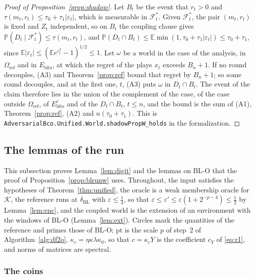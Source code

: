 \documentclass[11pt]{amsart}
\theoremstyle{definition}
\numberwithin{equation}{section}
\newcommand{\E}{\mathbb{E}}
\newcommand{\Prob}{\mathbb{P}}
\newcommand{\cK}{\mathcal{K}}
\newcommand{\cF}{\mathscr{F}}
\begin{document}
\begin{proof}[Proof of Proposition~\ref{prop:shadow}]
Let $B_t$ be the event that $r_t>0$ and $\tau(m_t,r_t)\le\tau_0+\tau_1|\varepsilon_t|$, which is measurable in $\cF^*_t$. Given $\cF^*_t$, the pair $(m_t,r_t)$ is fixed and $Z_t$ independent, so on $B_t$ the coupling clause gives $\Prob(D_t\mid\cF^*_t)\le\tau(m_t,r_t)$, and $\Prob(D_t\cap B_t)\le\E\min(1,\tau_0+\tau_1|\varepsilon_t|)\le\tau_0+\tau_1$, since $\E|\varepsilon_t|\le(\E e^{\varepsilon_t^2}-1)^{1/2}\le1$. Let $\omega$ be a world in the case of the analysis, in $\Omega_{\mathrm{ref}}$ and in $E_{\mathrm{bits}}$, at which the regret of the plays $x_t$ exceeds $B_n+1$. If no round decouples, (A3) and Theorem~\ref{prop:ref} bound that regret by $B_n+1$; so some round decouples, and at the first one, $t$, (A3) puts $\omega$ in $D_t\cap B_t$. The event of the claim therefore lies in the union of the complement of the case, of the case outside $\Omega_{\mathrm{ref}}$, of $E_{\mathrm{bits}}^c$ and of the $D_t\cap B_t$, $t\le n$, and the bound is the sum of (A1), Theorem~\ref{prop:ref}, (A2) and $n(\tau_0+\tau_1)$.
This is \texttt{AdversarialBco.Unified.World.shadowPropW\_holds} in the formalization.
\end{proof}

\subsection{The lemmas of the run}\label{app:track}

This subsection proves Lemma~\ref{lem:digit} and the lemmas on BL-O that the proof of Proposition~\ref{prop:blrunw} uses. Throughout, the input satisfies the hypotheses of Theorem~\ref{thm:unified}, the oracle is a weak membership oracle for $\cK$, the reference runs at $\delta_{\mathrm{BL}}$ with $\varepsilon\le\frac14$, so that $\varepsilon\le\varepsilon'\le\varepsilon(1+2^{-p-4})\le\frac12$ by Lemma~\ref{lem:enc}, and the coupled world is the extension of an environment with the windows of BL-O (Lemma~\ref{lem:ext}). Circles mark the quantities of the reference and primes those of BL-O; $\mathrm{pt}$ is the scale $p$ of step~2 of Algorithm~\ref{alg:df2o}, $\kappa_c=\eta\kappa\lambda\kappa_0$, so that $c=\kappa_cY$ is the coefficient $c_Y$ of \eqref{eq:r1}, and norms of matrices are spectral.

\subsubsection{The coins}\label{app:track-coins}
\end{document}
